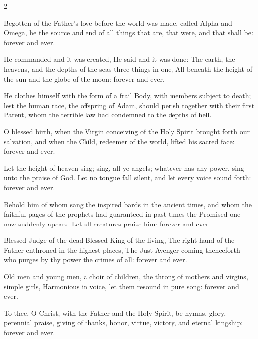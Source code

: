 \begin{multicols}{2}
\raggedcolumns
\begin{enpars}
Begotten of the Father’s love before the world was made, called Alpha and
Omega, he the source and end of all things that are, that were, and that shall
be: forever and ever.


He commanded and it was created,
He said and it was done:
The earth, the heavens, and the depths of the seas
three things in one,
All beneath the height of the sun and the globe of the moon: forever and ever.


He clothes himself with the form of a frail Body,
with members subject to death; lest the human
race, the offspring of Adam, should perish
together with their first Parent, whom the terrible
law had condemned to the depths of hell. 

O blessed birth, when the Virgin conceiving of the Holy Spirit brought forth
our salvation, and when the Child, redeemer of the world, lifted his sacred face: forever and ever.

Let the height of heaven sing; sing, all ye angels; whatever has any power, sing
unto the praise of God. Let no tongue fall silent, and let every voice sound
forth: forever and ever.


Behold him of
whom sang the inspired bards in the ancient
times, and whom the faithful pages of the prophets
had guaranteed in past times 
 the Promised one now suddenly apears.
 Let all creatures praise him: forever and ever.

Blessed Judge of the dead
Blessed King of the living,
The right hand of the Father enthroned in the highest places,
The Just Avenger
coming thenceforth
who purges by thy power
the crimes of all: forever and ever.

Old men and young men, a choir of children, the throng
of mothers and virgins, simple girls, Harmonious in voice, let them resound in pure song: forever and
ever.

To thee, O Christ, with the Father and the Holy Spirit, be hymns, glory,
perennial praise, giving of thanks, honor, virtue, victory, and eternal kingship: forever and ever.


\end{enpars}
\end{multicols}